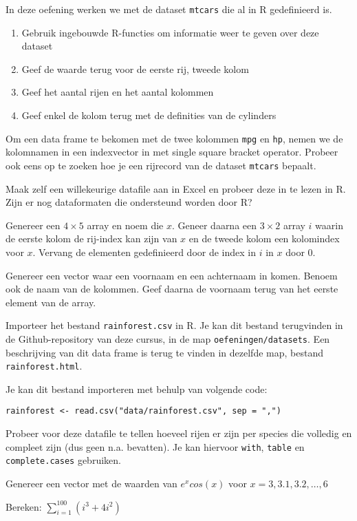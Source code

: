 \begin{exercise}
    In deze oefening werken we met de dataset \texttt{mtcars} die al in R gedefinieerd is.
    \begin{enumerate}
        \item   Gebruik ingebouwde R-functies om informatie weer te geven over deze dataset
        \item   Geef de waarde terug voor de eerste rij, tweede kolom
        \item   Geef het aantal rijen en het aantal kolommen
        \item   Geef enkel de kolom terug met de definities van de cylinders
    \end{enumerate}

    Om een data frame te bekomen met de twee kolommen \texttt{mpg} en \texttt{hp}, nemen we de kolomnamen in een indexvector in met single square bracket operator. Probeer ook eens op te zoeken hoe je een rijrecord van de dataset \texttt{mtcars} bepaalt.
\end{exercise}

\begin{exercise}
  Maak zelf een willekeurige datafile aan in Excel en probeer deze in te lezen in R. Zijn er nog dataformaten die ondersteund worden door R?
\end{exercise}

\begin{exercise}
  Genereer een $4 \times 5$ array en noem die $x$. Geneer daarna een $3 \times 2$ array $i$ waarin de eerste kolom de rij-index kan zijn van $x$ en de tweede kolom een kolomindex voor $x$. Vervang de elementen gedefinieerd door de index in $i$ in $x$ door 0.
\end{exercise}

\begin{exercise}
  Genereer een vector waar een voornaam en een achternaam in komen. Benoem ook de naam van de kolommen. Geef daarna de voornaam terug van het eerste element van de array.
\end{exercise}

\begin{exercise}
  Importeer het bestand \texttt{rainforest.csv} in R.
  Je kan dit bestand terugvinden in de Github-repository van deze cursus, in de map \texttt{oefeningen/datasets}.
  Een beschrijving van dit data frame is terug te vinden in dezelfde map, bestand \texttt{rainforest.html}.

  Je kan dit bestand importeren met behulp van volgende code:
  \begin{lstlisting}
rainforest <- read.csv("data/rainforest.csv", sep = ",")
  \end{lstlisting}

  Probeer voor deze datafile te tellen hoeveel rijen er zijn per species die volledig en compleet zijn (dus geen n.a. bevatten).
  Je kan hiervoor \texttt{with}, \texttt{table} en \texttt{complete.cases} gebruiken.
\end{exercise}

\begin{exercise}
	Genereer een vector met de waarden van $e^x cos(x)$ voor $x= 3, 3.1, 3.2, \dots ,6$
\end{exercise}

\begin{exercise}
	Bereken: $\sum_{i=1}^{100}(i^3 + 4i^2)$
\end{exercise}
